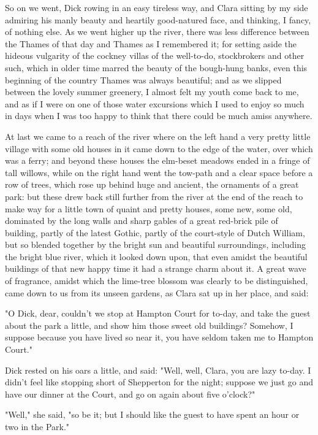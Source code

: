 So on we went, Dick rowing in an easy tireless way, and Clara sitting by
my side admiring his manly beauty and heartily good-natured face, and
thinking, I fancy, of nothing else. As we went higher up the river,
there was less difference between the Thames of that day and Thames as I
remembered it; for setting aside the hideous vulgarity of the cockney
villas of the well-to-do, stockbrokers and other such, which in older
time marred the beauty of the bough-hung banks, even this beginning of
the country Thames was always beautiful; and as we slipped between the
lovely summer greenery, I almost felt my youth come back to me, and as
if I were on one of those water excursions which I used to enjoy so much
in days when I was too happy to think that there could be much amiss
anywhere.

At last we came to a reach of the river where on the left hand a very
pretty little village with some old houses in it came down to the edge
of the water, over which was a ferry; and beyond these houses the
elm-beset meadows ended in a fringe of tall willows, while on the right
hand went the tow-path and a clear space before a row of trees, which
rose up behind huge and ancient, the ornaments of a great park: but
these drew back still further from the river at the end of the reach to
make way for a little town of quaint and pretty houses, some new, some
old, dominated by the long walls and sharp gables of a great red-brick
pile of building, partly of the latest Gothic, partly of the court-style
of Dutch William, but so blended together by the bright sun and
beautiful surroundings, including the bright blue river, which it looked
down upon, that even amidst the beautiful buildings of that new happy
time it had a strange charm about it. A great wave of fragrance, amidst
which the lime-tree blossom was clearly to be distinguished, came down
to us from its unseen gardens, as Clara sat up in her place, and said:

"O Dick, dear, couldn't we stop at Hampton Court for to-day, and take
the guest about the park a little, and show him those sweet old
buildings? Somehow, I suppose because you have lived so near it, you
have seldom taken me to Hampton Court."

Dick rested on his oars a little, and said: "Well, well, Clara, you are
lazy to-day. I didn't feel like stopping short of Shepperton for the
night; suppose we just go and have our dinner at the Court, and go on
again about five o'clock?"

"Well," she said, "so be it; but I should like the guest to have spent
an hour or two in the Park."

